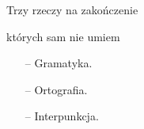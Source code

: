 \documentclass{beamer}
\begin{document}
\begin{frame}{Trzy rzeczy na zakończenie}


\begin{block}{których sam nie umiem}
\begin{itemize}
\item[--] Gramatyka.
\item[--] Ortografia.
\item[--] Interpunkcja.
\end{itemize}
\end{block}

\end{frame}
\end{document}
